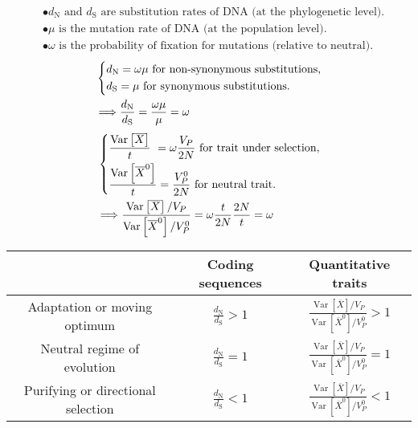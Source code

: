 \documentclass{article}
\DeclareMathOperator{\Var}{\text{Var}}
\newcommand{\Ne}{N}
\newcommand{\dn}{d_\text{N}}
\newcommand{\ds}{d_\text{S}}
\newcommand{\dnds}{\frac{\dn}{\ds}}
\newcommand{\VarPhenotype}{V_{P}}
\newcommand{\Trait}{X}
\begin{document}
\begin{align*}
&\bullet \dn \text{ and } \ds \text{ are substitution rates of DNA (at the phylogenetic level).} \\
&\bullet \mu \text{ is the mutation rate of DNA (at the population level).} \\
&\bullet \omega \text{ is the probability of fixation for mutations (relative to neutral).}
\end{align*}
\vspace*{-0.5cm}
\begin{align*}
&\begin{dcases}
	\dn = \omega \mu \text{ for non-synonymous substitutions}, \\
	\ds =  \mu \text{ for synonymous substitutions}.
\end{dcases} \\
&\Longrightarrow
\dnds = \frac{\omega \mu}{\mu} = \omega 
\end{align*}
\begin{align*}
&\begin{dcases}
	\frac{\Var \left[ \overline{\Trait}\right] }{t} ~ = \omega \frac{\VarPhenotype}{2 \Ne} \text{ for trait under selection}, \\
	\frac{\Var \left[ \overline{\Trait}^0\right] }{t} = \frac{\VarPhenotype^0}{2 \Ne} \text{ for  neutral trait}.
\end{dcases} \\
&\Longrightarrow
\frac{\Var \left[ \overline{\Trait}\right] / \VarPhenotype }{\Var \left[ \overline{\Trait}^0\right] / \VarPhenotype^0 } = \omega \frac{  t}{ 2 \Ne}\frac{ 2 \Ne }{ t} = \omega 
\end{align*}
\begin{table}[H]
	\centering
	\begin{tabu}{|c||c|c|}
			\hline
			& Coding sequences & Quantitative traits \\ \hline \hline
			Adaptation or moving optimum & $\dnds > 1$ & $\frac{\Var \left[ \overline{\Trait}\right] / \VarPhenotype }{\Var \left[ \overline{\Trait}^0\right] / \VarPhenotype^0 } > 1  $ \\ \hline
			Neutral regime of evolution & $\dnds = 1$ & $\frac{\Var \left[ \overline{\Trait}\right] / \VarPhenotype }{\Var \left[ \overline{\Trait}^0\right] / \VarPhenotype^0 } = 1 $ \\ \hline
			Purifying or directional selection & $\dnds < 1$ & $\frac{\Var \left[ \overline{\Trait}\right] / \VarPhenotype }{\Var \left[ \overline{\Trait}^0\right] / \VarPhenotype^0 } < 1$ \\ \hline
	\end{tabu}
\end{table}
\end{document}
